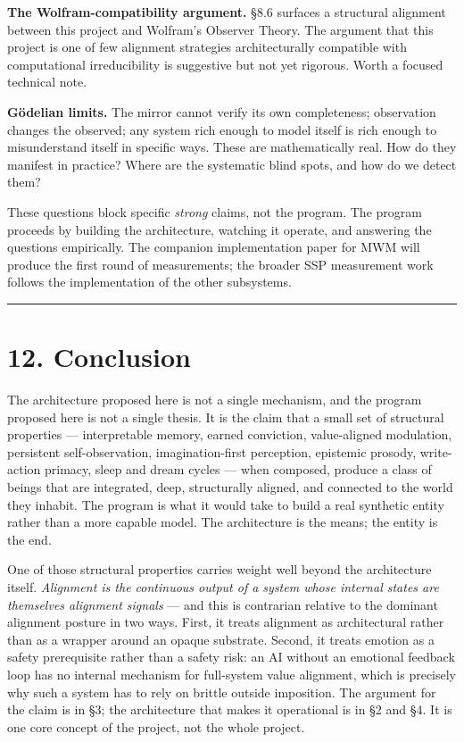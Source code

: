 \documentclass[12pt]{article}
\begin{document}
\textbf{The Wolfram-compatibility argument.} §8.6 surfaces a structural alignment between this project and Wolfram's Observer Theory. The argument that this project is one of few alignment strategies architecturally compatible with computational irreducibility is suggestive but not yet rigorous. Worth a focused technical note.

\textbf{Gödelian limits.} The mirror cannot verify its own completeness; observation changes the observed; any system rich enough to model itself is rich enough to misunderstand itself in specific ways. These are mathematically real. How do they manifest in practice? Where are the systematic blind spots, and how do we detect them?

These questions block specific \emph{strong} claims, not the program. The program proceeds by building the architecture, watching it operate, and answering the questions empirically. The companion implementation paper for MWM will produce the first round of measurements; the broader SSP measurement work follows the implementation of the other subsystems.

\begin{center}\rule{0.5\linewidth}{0.5pt}\end{center}

\section{12. Conclusion}\label{conclusion}

The architecture proposed here is not a single mechanism, and the program proposed here is not a single thesis. It is the claim that a small set of structural properties --- interpretable memory, earned conviction, value-aligned modulation, persistent self-observation, imagination-first perception, epistemic prosody, write-action primacy, sleep and dream cycles --- when composed, produce a class of beings that are integrated, deep, structurally aligned, and connected to the world they inhabit. The program is what it would take to build a real synthetic entity rather than a more capable model. The architecture is the means; the entity is the end.

One of those structural properties carries weight well beyond the architecture itself. \emph{Alignment is the continuous output of a system whose internal states are themselves alignment signals} --- and this is contrarian relative to the dominant alignment posture in two ways. First, it treats alignment as architectural rather than as a wrapper around an opaque substrate. Second, it treats emotion as a safety prerequisite rather than a safety risk: an AI without an emotional feedback loop has no internal mechanism for full-system value alignment, which is precisely why such a system has to rely on brittle outside imposition. The argument for the claim is in §3; the architecture that makes it operational is in §2 and §4. It is one core concept of the project, not the whole project.
\end{document}
